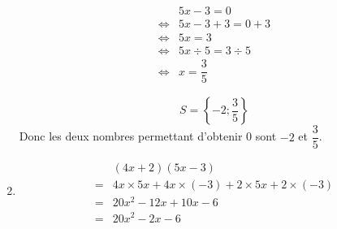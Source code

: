 \begin{enumerate}
\begin{multicols}{2}
            \begin{align*}
                &5x-3=0\\
                \iff & 5x-3+3=0+3\\
                \iff & 5x=3\\
                \iff & 5x\div 5=3\div5\\
                \iff & x=\dfrac{3}{5}
            \end{align*}
        \end{multicols}
        $$S=\left\{-2;\dfrac{3}{5}\right\}$$
       Donc les deux nombres permettant d'obtenir 0 sont $-2$ et $\dfrac{3}{5}$.

       \vspace*{1em}\item 
       \begin{align*}
            &(4x+2)(5x-3)\\
            =&4x\times 5x +4x\times (-3)+2\times 5x +2\times (-3)\\
            =&20x^2-12x+10x-6\\
            =&20x^2 -2x-6
       \end{align*}
\end{enumerate}


